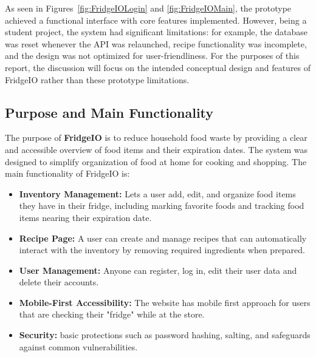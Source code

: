 As seen in Figures~\ref{fig:FridgeIOLogin} and \ref{fig:FridgeIOMain}, the prototype achieved a functional interface with core features implemented. However, being a student project, the system had significant limitations: for example, the database was reset whenever the API was relaunched, recipe functionality was incomplete, and the design was not optimized for user-friendliness. For the purposes of this report, the discussion will focus on the intended conceptual design and features of FridgeIO rather than these prototype limitations.

\subsection{Purpose and Main Functionality}
The purpose of \textbf{FridgeIO} is to reduce household food waste by providing a clear and accessible overview of food items and their expiration dates. The system was designed to simplify organization of food at home for cooking and shopping. The main functionality of FridgeIO is:

\begin{itemize}
    \item \textbf{Inventory Management:} Lets a user add, edit, and organize food items they have in their fridge, including marking favorite foods and tracking food items nearing their expiration date.
    \item \textbf{Recipe Page:} A user can create and manage recipes that can automatically interact with the inventory by removing required ingredients when prepared.
    \item \textbf{User Management:} Anyone can register, log in, edit their user data and delete their accounts.
    \item \textbf{Mobile-First Accessibility:} The website has mobile first approach for users that are checking their "fridge" while at the store.
    \item \textbf{Security:} basic protections such as password hashing, salting, and safeguards against common vulnerabilities.
\end{itemize}

